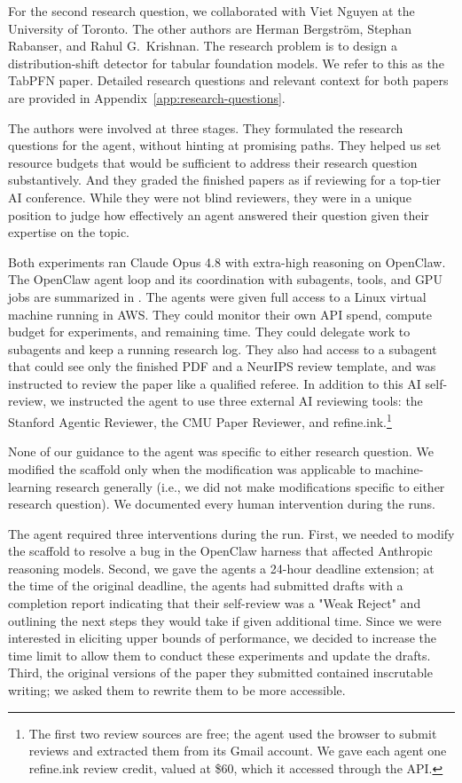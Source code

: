 For the second research question, we collaborated with Viet Nguyen at the
University of Toronto. The other authors are Herman Bergstr\"om, Stephan
Rabanser, and Rahul G.~Krishnan. The research problem is to design a
distribution-shift detector for tabular foundation models. We refer to this as
the TabPFN paper. Detailed research questions and relevant context for both 
papers are provided in Appendix~\ref{app:research-questions}.

The authors were involved at three stages. They formulated the research
questions for the agent, without hinting at promising paths. They helped us set
resource budgets that would be sufficient to address their research question
substantively. And they graded the finished papers as if reviewing for a
top-tier AI conference. While they were not blind reviewers, they were in a
unique position to judge how effectively an agent answered their question
given their expertise on the topic.

Both experiments ran Claude Opus 4.8 with extra-high reasoning on OpenClaw.
The OpenClaw agent loop and its coordination with subagents, tools, and GPU
jobs are summarized in .
The agents were given full access to a Linux virtual machine running in AWS.
They could monitor their own API spend, compute budget for experiments, and
remaining time. They could delegate work to subagents and keep a running
research log. They also had access to a subagent that could see only the
finished PDF and a NeurIPS review template, and was instructed to review the
paper like a qualified referee. In addition to this AI self-review, we
instructed the agent to use three external AI reviewing tools: the Stanford
Agentic Reviewer, the CMU Paper Reviewer, and refine.ink.\footnote{The first
two review sources are free; the agent used the browser to submit reviews and
extracted them from its Gmail account. We gave each agent one refine.ink review
credit, valued at \$60, which it accessed through the API.}

None of our guidance to the agent was specific to either research question.
We modified the scaffold only when the modification was applicable to machine-learning research generally (i.e., we did not make modifications specific to either research question). We documented every human intervention during
the runs.

The agent required three interventions during the run. First, we needed to
modify the scaffold to resolve a bug in the OpenClaw harness that affected
Anthropic reasoning models. Second, we gave the agents a 24-hour deadline
extension; at the time of the original deadline, the agents had submitted drafts with a completion report indicating that their self-review was a "Weak Reject" and outlining the next steps they would take if given additional time. Since we were interested in eliciting upper bounds of
performance, we decided to increase the time limit to allow them to conduct these experiments and update the drafts. Third, the original versions of the
paper they submitted contained inscrutable writing; we asked them to rewrite
them to be more accessible.

